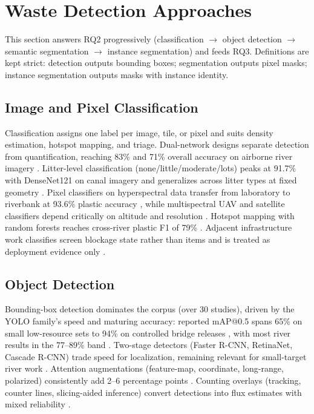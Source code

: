 \section{Waste Detection Approaches}
\label{sec:approaches}

This section answers RQ2 progressively (classification $\rightarrow$ object detection $\rightarrow$ semantic segmentation $\rightarrow$ instance segmentation) and feeds RQ3. Definitions are kept strict: detection outputs bounding boxes; segmentation outputs pixel masks; instance segmentation outputs masks with instance identity.

\subsection{Image and Pixel Classification}
Classification assigns one label per image, tile, or pixel and suits density estimation, hotspot mapping, and triage. Dual-network designs separate detection from quantification, reaching 83\% and 71\% overall accuracy on airborne river imagery \cite{Wolf2020}. Litter-level classification (none/little/moderate/lots) peaks at 91.7\% with DenseNet121 on canal imagery and generalizes across litter types at fixed geometry \cite{JiaFrontiers2023}. Pixel classifiers on hyperspectral data transfer from laboratory to riverbank at 93.6\% plastic accuracy \cite{Tasseron2022}, while multispectral UAV and satellite classifiers depend critically on altitude and resolution \cite{Cortesi2022,Mohsen2023}. Hotspot mapping with random forests reaches cross-river plastic F1 of 79\% \cite{PerezGarcia2025}. Adjacent infrastructure work classifies screen blockage state rather than items and is treated as deployment evidence only \cite{Vandaele2024}.

\subsection{Object Detection}
Bounding-box detection dominates the corpus (over 30 studies), driven by the YOLO family's speed and maturing accuracy: reported mAP@0.5 spans 65\% on small low-resource sets \cite{Putra2021} to 94\% on controlled bridge releases \cite{Reinhardt2024}, with most river results in the 77--89\% band \cite{Lin2021,Yang2022,Zailan2022,Nunkhaw2024}. Two-stage detectors (Faster R-CNN, RetinaNet, Cascade R-CNN) trade speed for localization, remaining relevant for small-target river work \cite{MPFasterRCNN2024,Cheng2021}. Attention augmentations (feature-map, coordinate, long-range, polarized) consistently add 2--6 percentage points \cite{Lin2021,Yang2022,Peng2024}. Counting overlays (tracking, counter lines, slicing-aided inference) convert detections into flux estimates with mixed reliability \cite{Putra2021,Lee2025,JiaFlux2025}.

